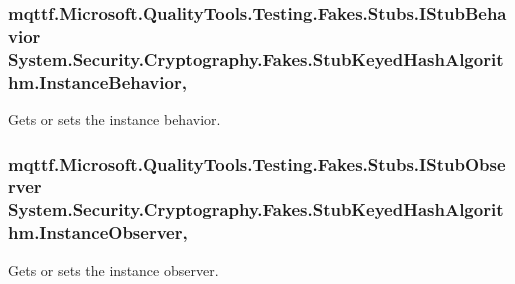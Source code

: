\hypertarget{class_system_1_1_security_1_1_cryptography_1_1_fakes_1_1_stub_keyed_hash_algorithm_af6fe1ed06f0676058b2d75405dd5e93b}{
\subsubsection[{Instance\-Behavior}]{\setlength{\rightskip}{0pt plus 5cm}mqttf.\-Microsoft.\-Quality\-Tools.\-Testing.\-Fakes.\-Stubs.\-I\-Stub\-Behavior System.\-Security.\-Cryptography.\-Fakes.\-Stub\-Keyed\-Hash\-Algorithm.\-Instance\-Behavior\hspace{0.3cm}{\ttfamily [get]}, {\ttfamily [set]}}}\label{class_system_1_1_security_1_1_cryptography_1_1_fakes_1_1_stub_keyed_hash_algorithm_af6fe1ed06f0676058b2d75405dd5e93b}


Gets or sets the instance behavior.

\hypertarget{class_system_1_1_security_1_1_cryptography_1_1_fakes_1_1_stub_keyed_hash_algorithm_a67c950120fe44684ed7b1400f4188b85}{
\subsubsection[{Instance\-Observer}]{\setlength{\rightskip}{0pt plus 5cm}mqttf.\-Microsoft.\-Quality\-Tools.\-Testing.\-Fakes.\-Stubs.\-I\-Stub\-Observer System.\-Security.\-Cryptography.\-Fakes.\-Stub\-Keyed\-Hash\-Algorithm.\-Instance\-Observer\hspace{0.3cm}{\ttfamily [get]}, {\ttfamily [set]}}}\label{class_system_1_1_security_1_1_cryptography_1_1_fakes_1_1_stub_keyed_hash_algorithm_a67c950120fe44684ed7b1400f4188b85}


Gets or sets the instance observer.

